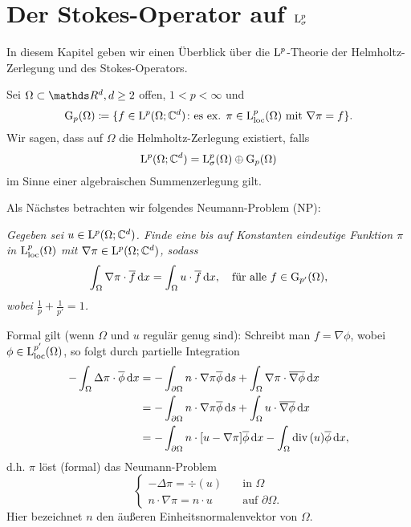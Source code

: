 \chapter{Der Stokes-Operator auf \texorpdfstring{$\mathrm{L}_\sigma^p$}{Lsigma\textasciicircum p}}

In diesem Kapitel geben wir einen Überblick über die $\mathrm{L}^p$-Theorie der Helmholtz-Zerlegung und des Stokes-Operators.

Sei $\Omega \subset \R^d, d \geq 2$ offen, $1 < p < \infty$ und 
$$
\mathrm{G}_p(\Omega) \coloneqq \{ f \in \mathrm{L}^p(\Omega; \mathbb{C}^d) \colon \text{es ex. } \pi \in \mathrm{L}_{\operatorname{loc}}^p(\Omega) \text{ mit } \nabla \pi = f\}.
$$
Wir sagen, dass auf $\Omega$ die Helmholtz-Zerlegung existiert, falls
$$
\mathrm{L}^p(\Omega; \mathbb{C}^d) = \mathrm{L}_\sigma^p(\Omega) \oplus \mathrm{G}_p(\Omega)
$$
im Sinne einer algebraischen Summenzerlegung gilt.

Als Nächstes betrachten wir folgendes Neumann-Problem (NP):

\emph{Gegeben sei $u \in \mathrm{L}^p(\Omega; \mathbb{C}^d)$.
Finde eine bis auf Konstanten eindeutige Funktion $\pi$ in $\mathrm{L}_{\operatorname{loc}}^p(\Omega)$ mit $\nabla \pi \in \mathrm{L}^p(\Omega; \mathbb{C}^d)$, sodass
$$
\int_\Omega \nabla \pi \cdot \overline f \, {\operatorname{d}\!{x}} = \int_\Omega u \cdot \overline f \, {\operatorname{d}\!{x}}, \quad\text{für alle } f \in \mathrm{G}_{p'}(\Omega),
$$
wobei $\frac{1}{p} + \frac{1}{p'} = 1$.}

Formal gilt (wenn $\Omega$ und $u$ regulär genug sind): Schreibt man $f = \nabla \phi$, wobei $\phi \in \mathrm{L}^{p'}_{\operatorname{loc}}(\Omega)$, so folgt durch partielle Integration
\begin{align*}
  -\int_\Omega \Delta\pi \cdot \overline{\phi} \, {\operatorname{d}\!{x}}
  &= -\int_{\partial\Omega} n \cdot \nabla\pi \overline\phi \, {\operatorname{d}\!{s}}
     +\int_\Omega \nabla \pi \cdot \overline{\nabla \phi} \, {\operatorname{d}\!{x}} \\
  &= - \int_{\partial\Omega} n \cdot \nabla \pi \overline \phi \, {\operatorname{d}\!{s}} 
     + \int_\Omega u \cdot \overline{\nabla \phi} \, {\operatorname{d}\!{x}} \\
     &= -\int_{\partial\Omega} n \cdot [u - \nabla\pi] \overline \phi \, {\operatorname{d}\!{x}}
        - \int_\Omega \mathrm{div\,} (u) \overline\phi \, {\operatorname{d}\!{x}},
\end{align*}
d.h. $\pi$ löst (formal) das Neumann-Problem
$$
\begin{cases}
  -\Delta \pi = \div (u)         &\quad\text{in } \Omega \\
  n \cdot \nabla \pi = n \cdot u &\quad\text{auf } \partial\Omega.
\end{cases}
$$
Hier bezeichnet $n$ den äußeren Einheitsnormalenvektor von $\Omega$.


